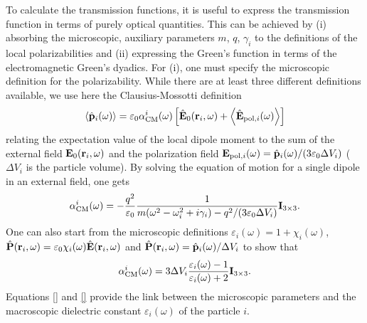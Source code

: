 To calculate the transmission functions, it is useful to express the transmission function in terms of purely optical quantities. This can be achieved by (i) absorbing the microscopic, auxiliary parameters $m$, $q$, $\gamma_i$ to the definitions of the local polarizabilities and (ii) expressing the Green's function in terms of the electromagnetic Green's dyadics. For (i), one must specify the microscopic definition for the polarizability. While there are at least three different definitions available, we use here the Clausius-Mossotti definition 
\begin{equation}
 \langle \hat {\mathbf{p}}_i(\omega) \rangle = \varepsilon_0 \alpha_{\textrm{CM}}^i(\omega) \left[\hat {\mathbf{E}}_0(\mathbf{r}_i,\omega)+ \left\langle \hat {\mathbf{E}}_{\textrm{pol},i} (\omega) \right\rangle \right]
\end{equation}
relating the expectation value of the local dipole moment to the sum of the external field $\mathbf{E}_0(\mathbf{r}_i,\omega)$ and the polarization field $\mathbf{E}_{\textrm{pol},i} (\omega)=\hat {\mathbf{p}}_i(\omega) /(3\varepsilon_0 \Delta V_i)$ ($\Delta V_i$ is the particle volume). By solving the equation of motion for a single dipole in an external field, one gets 
\begin{equation}
 \alpha_{\textrm{CM}}^i(\omega) = - \frac{q^2}{\varepsilon_0} \frac{1}{m(\omega^2-\omega_i^2+i\gamma_i)-q^2/(3\varepsilon_0\Delta V_i)}\mathbf{I}_{3 \times 3}. \label{eq:gfm_alpha_cm_expr}
\end{equation}
One can also start from the microscopic definitions $\varepsilon_i(\omega)=1+\chi_i(\omega)$, $\hat{\mathbf{P}}(\mathbf{r}_i,\omega)=\varepsilon_0 \chi_i(\omega) \hat{\mathbf{E}}(\mathbf{r}_i,\omega)$ and $\hat{\mathbf{P}}(\mathbf{r}_i,\omega)=\hat{\mathbf{p}}_i(\omega)/\Delta V_i$ to show that
\begin{equation}
 \alpha_{\textrm{CM}}^i(\omega) = 3\Delta V_i \frac{\varepsilon_i(\omega)-1}{\varepsilon_i(\omega)+2} \mathbf{I}_{3 \times 3}. \label{eq:alphacm_epsilon}
\end{equation}
Equations \eqref{} and \eqref{} provide the link between the microscopic parameters and the macroscopic dielectric constant $\varepsilon_i(\omega)$ of the particle $i$.


